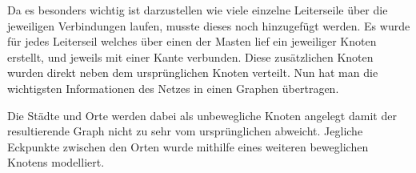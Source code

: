 Da es besonders wichtig ist darzustellen wie viele einzelne Leiterseile über die jeweiligen Verbindungen laufen, musste dieses noch hinzugefügt werden. Es wurde für jedes Leiterseil welches über einen der Masten lief ein jeweiliger Knoten erstellt, und jeweils mit einer Kante verbunden. Diese zusätzlichen Knoten wurden direkt neben dem ursprünglichen Knoten verteilt. Nun hat man die wichtigsten Informationen des Netzes in einen Graphen übertragen.

Die Städte und Orte werden dabei als unbewegliche Knoten angelegt damit der resultierende Graph nicht zu sehr vom ursprünglichen abweicht. Jegliche Eckpunkte zwischen den Orten wurde mithilfe eines weiteren beweglichen Knotens modelliert.

\begin{figure}[t]
	\centering
	\hspace{1.0cm}%
\end{figure}
